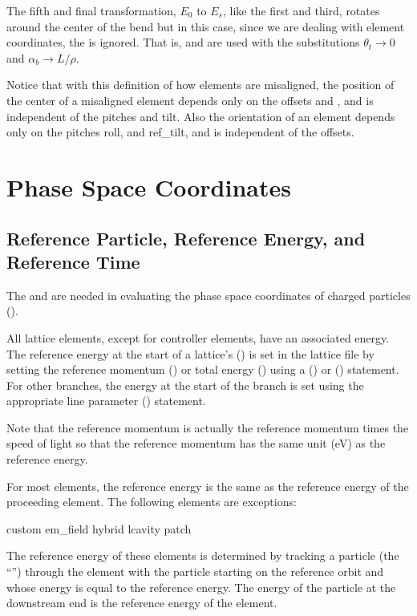The fifth and final transformation, $E_0$ to $E_s$, like the first and third, rotates around the
center of the bend but in this case, since we are dealing with element coordinates, the
 is ignored.  That is,  and  are used with the substitutions
$\theta_t \rightarrow 0$ and $\alpha_b \rightarrow L/\rho$.

Notice that with this definition of how elements are misaligned, the position of the center of a
misaligned element depends only on the offsets and , and is independent of the pitches and
tilt. Also the orientation of an element depends only on the pitches roll, and ref_tilt, and is
independent of the offsets.

\section{Phase Space Coordinates}
\label{s:phase.coords}

\subsection{Reference Particle, Reference Energy, and Reference Time}
\label{s:ref.energy}

The  and  are needed in evaluating the phase space
coordinates of charged particles ().

All lattice elements, except for controller elements, have an associated 
energy.  The reference energy at the start of a lattice's  () is
set in the lattice file by setting the reference momentum () or total energy ()
using a  () or  () statement. For other
branches, the energy at the start of the branch is set using the appropriate line parameter
() statement.

Note that the reference momentum  is actually the reference momentum times the speed of light
so that the reference momentum has the same unit (eV) as the reference energy.


For most elements, the reference energy is the same as the reference energy of the proceeding
element. The following elements are exceptions:
\begin{example}
  custom
  em_field
  hybrid
  lcavity
  patch
\end{example}
The reference energy of these elements is determined by tracking a particle (the ``'') through the element with the particle starting on the reference orbit and whose energy
is equal to the reference energy.  The energy of the particle at the downstream end is the reference
energy of the element.


